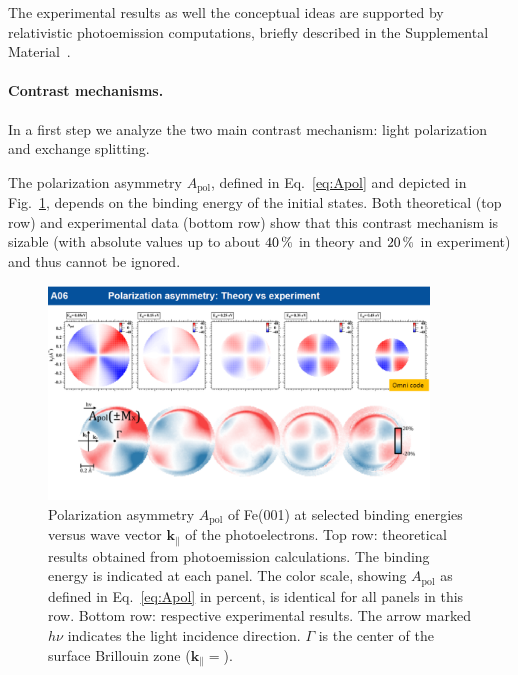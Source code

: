 \documentclass[prl,twocolumn,floatfix]{revtex4-2}
\renewcommand{\vec}[1]{\boldsymbol{#1}}
\begin{document}
The experimental results as well the conceptual ideas are supported by relativistic photoemission computations, briefly described in the Supplemental Material~\cite{Supplement}.

\paragraph{Contrast mechanisms.} In a first step we analyze the two main contrast mechanism: light polarization and exchange splitting.

The polarization asymmetry $A_{\mathrm{pol}}$, defined in Eq.~\eqref{eq:Apol} and depicted in Fig.~\ref{fig:Apol}, depends on the binding energy of the initial states. Both theoretical (top row) and experimental data (bottom row) show
that this contrast mechanism is sizable (with absolute values up to about $\unit[40]{\%}$ in theory and $\unit[20]{\%}$ in experiment) and thus cannot be ignored. 

\begin{figure}
    \centering
    \includegraphics[width = 0.9\textwidth]{Apol}
    \caption{Polarization asymmetry $A_{\mathrm{pol}}$ of Fe(001) at selected binding energies versus wave vector $\vec{k}_{\parallel}$ of the photoelectrons. Top row: theoretical results obtained from photoemission calculations. The binding energy is indicated at each panel. The color scale, showing $A_{\mathrm{pol}}$ as defined in Eq.~\eqref{eq:Apol} in percent, is identical for all panels in this row. Bottom row: respective experimental results. The arrow marked $h \nu$ indicates the light incidence direction. $\Gamma$ is the center of the surface Brillouin zone ($\vec{k}_{\parallel} = $).}
    \label{fig:Apol}
\end{figure}
\end{document}
